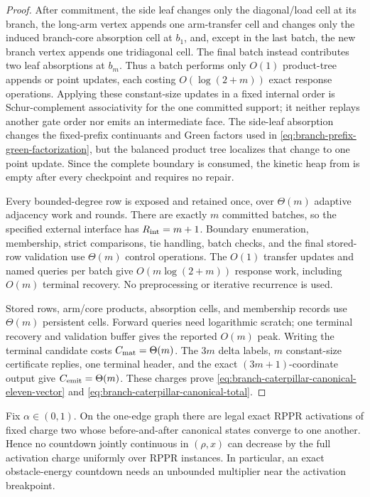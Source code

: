 \begin{proof}
After commitment, the side leaf changes only the diagonal/load cell at its
branch, the long-arm vertex appends one arm-transfer cell and changes only the
induced branch-core absorption cell at $b_1$, and,
except in the last batch, the new branch vertex appends one tridiagonal cell.
The final batch instead contributes two leaf absorptions at $b_m$.  Thus a
batch performs only $O(1)$ product-tree appends or point updates, each costing
$O(\log(2+m))$ exact response operations.  Applying these constant-size
updates in a fixed internal order is Schur-complement associativity for the
one committed support; it neither replays another gate order nor emits an
intermediate face.  The side-leaf absorption changes the fixed-prefix
continuants and Green factors used in
\eqref{eq:branch-prefix-green-factorization}, but the balanced product tree
localizes that change to one point update.  Since the complete boundary is
consumed, the kinetic heap
from  is empty after every
checkpoint and requires no repair.

Every bounded-degree row is exposed and retained once, over $\Theta(m)$
adaptive adjacency work and rounds.  There are exactly $m$ committed batches,
so the specified external interface has $R_{\rm int}=m+1$.  Boundary
enumeration, membership, strict comparisons, tie handling, batch checks, and
the final stored-row validation use $\Theta(m)$ control operations.  The
$O(1)$ transfer updates and named queries per batch give
$O(m\log(2+m))$ response work, including $O(m)$ terminal recovery.  No
preprocessing or iterative recurrence is used.

Stored rows, arm/core products, absorption cells, and membership records use
$\Theta(m)$ persistent cells.  Forward queries need logarithmic scratch; one
terminal recovery and validation buffer gives the reported $O(m)$ peak.
Writing the terminal candidate costs $C_{\rm mat}=\Theta(m)$.  The $3m$
delta labels, $m$ constant-size certificate replies, one terminal header, and
the exact $(3m+1)$-coordinate output give
$C_{\rm emit}=\Theta(m)$.  These charges prove
\eqref{eq:branch-caterpillar-canonical-eleven-vector} and
\eqref{eq:branch-caterpillar-canonical-total}.
\end{proof}

\begin{proposition}
\label{prop:no-continuous-activation-countdown}
Fix $\alpha\in(0,1)$.  On the one-edge graph there are legal exact RPPR
activations of fixed charge two whose before-and-after canonical states
converge to one another.  Hence no countdown jointly continuous in
$(\rho,x)$ can decrease by the full activation charge uniformly over RPPR
instances.  In particular, an exact obstacle-energy countdown needs an
unbounded multiplier near the activation breakpoint.
\end{proposition}

